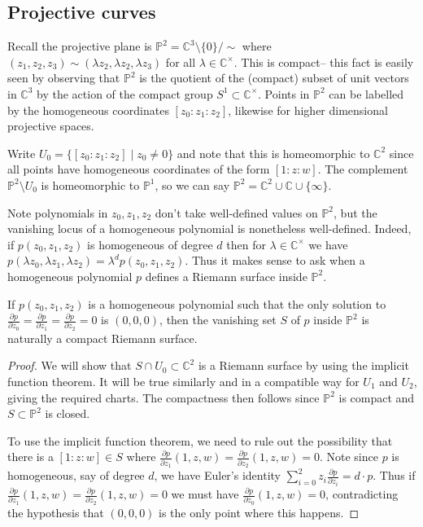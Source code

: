 \subsection{Projective curves}
Recall the projective plane is \(\mathbb{P}^2=\mathbb{C}^3\setminus \{0\}/\sim\)
where \((z_1,z_2,z_3)\sim (\lambda z_2,\lambda z_2, \lambda z_3)\) for all
\(\lambda\in \mathbb{C}^\times\). This is compact-- this fact is easily seen by
observing that \(\mathbb{P}^2\) is the quotient of the (compact) subset of unit
vectors in \(\mathbb{C}^3\) by the action of the compact group \(S^1\subset
\mathbb{C}^\times\). Points in \(\mathbb{P}^2\) can be labelled by the
homogeneous coordinates \([z_0:z_1:z_2]\), likewise for higher dimensional
projective spaces.

Write \(U_0=\{[z_0:z_1:z_2]\;|\; z_0\neq 0\}\) and note that this is
homeomorphic to \(\mathbb{C}^2\) since all points have homogeneous coordinates
of the form \([1:z:w]\). The complement \(\mathbb{P}^2\setminus U_0\) is
homeomorphic to \(\mathbb{P}^1\), so we can say \(\mathbb{P}^2=\mathbb{C}^2\cup
\mathbb{C}\cup  \{\infty\}\).

Note polynomials in \(z_0,z_1,z_2\) don't take well-defined values on
\(\mathbb{P}^2\), but the vanishing locus of a homogeneous polynomial is
nonetheless well-defined. Indeed, if \(p(z_0,z_1,z_2)\) is homogeneous of degree
\(d\) then for \(\lambda\in \mathbb{C}^\times\) we have \(p(\lambda z_0,
\lambda z_1, \lambda z_2) = \lambda^dp(z_0,z_1,z_2)\). Thus it makes sense to
ask when a homogeneous polynomial \(p\) defines a Riemann surface inside
\(\mathbb{P}^2\).

\begin{proposition}
    If \(p(z_0,z_1,z_2)\) is a homogeneous polynomial such that
    the only solution to \(\frac{\partial p}{\partial z_0}=\frac{\partial
    p}{\partial z_1}=\frac{\partial p}{\partial z_2}= 0\) is \((0,0,0)\), then
    the vanishing set \(S\) of \(p\) inside \(\mathbb{P}^2\) is naturally a
    compact Riemann surface.

    \begin{proof}
        We will show that \(S\cap U_0 \subset \mathbb{C}^2\) is a Riemann
        surface by using the implicit function theorem. It will be true
        similarly and in a compatible way for \(U_1\) and \(U_2\), giving the
        required charts. The compactness then follows since \(\mathbb{P}^2\) is
        compact and \(S\subset \mathbb{P}^2\) is closed.

        To use the implicit function theorem, we need to rule out the
        possibility that there is a \([1:z:w]\in S\) where \(\frac{\partial
        p}{\partial z_1}(1,z,w)=\frac{\partial p}{\partial z_2}(1,z,w)=0\). Note since \(p\) is homogeneous, say of degree \(d\), we have Euler's
        identity \(\sum_{i=0}^2 z_i \frac{\partial p}{\partial z_i} = d\cdot
        p\).  Thus if \(\frac{\partial p}{\partial z_1}(1,z,w)=\frac{\partial
        p}{\partial z_2}(1,z,w)=0\)  we must have \(\frac{\partial p}{\partial
        z_0}(1,z,w)=0\), contradicting the hypothesis that \((0,0,0)\) is the
        only point where this happens.
     \end{proof}
\end{proposition}

